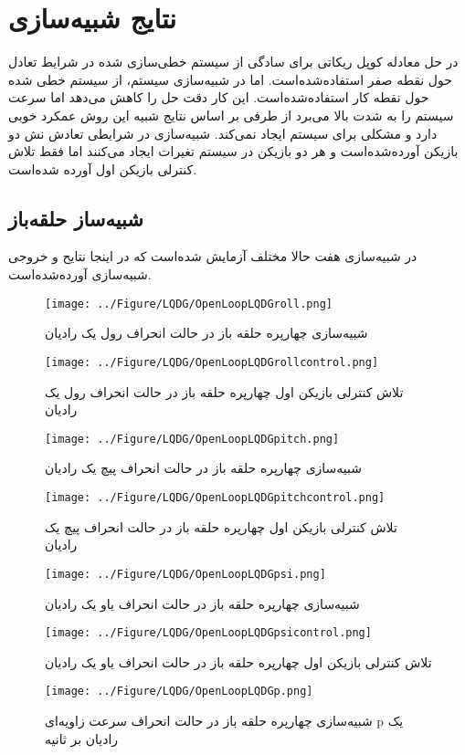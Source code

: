\chapter{نتایج شبیه‌سازی}
در حل معادله کوپل ریکاتی برای سادگی از سیستم خطی‌سازی شده در شرایط تعادل حول نقطه صفر استفاده‌شده‌است. اما در شبیه‌سازی سیستم، از سیستم خطی شده حول نقطه کار استفاده‌شده‌است. این کار دقت حل را کاهش می‌دهد اما سرعت سیستم را به شدت بالا می‌برد از طرفی بر اساس نتایج شبیه این روش عمکرد خوبی دارد و مشکلی برای سیستم ایجاد نمی‌کند. شبیه‌سازی در شرایطی تعادش نش دو بازیکن آورده‌شده‌است و هر دو بازیکن در سیستم تغیرات ایجاد می‌کنند اما فقط تلاش کنترلی بازیکن اول آورده شده‌است.
\section{شبیه‌ساز حلقه‌باز}
در شبیه‌سازی هفت حالا مختلف آزمایش شده‌است که در اینجا نتایح و خروجی شبیه‌‌سازی آورده‌شده‌است.
\begin{figure}[H]
	\texttt{[image: ../Figure/LQDG/OpenLoopLQDGroll.png]}
	\centering
	\caption{شبیه‌‌سازی چهارپره حلقه باز در حالت انحراف رول یک رادیان}
\end{figure}
\begin{figure}[H]
	\texttt{[image: ../Figure/LQDG/OpenLoopLQDGrollcontrol.png]}
	\centering
	\caption{تلاش کنترلی بازیکن اول چهارپره حلقه باز در حالت انحراف رول یک رادیان}
\end{figure}
	\begin{figure}[H]
		\texttt{[image: ../Figure/LQDG/OpenLoopLQDGpitch.png]}
		\centering
		\caption{شبیه‌‌سازی چهارپره حلقه باز در حالت انحراف پیچ یک رادیان}
	\end{figure}
	\begin{figure}[H]
		\texttt{[image: ../Figure/LQDG/OpenLoopLQDGpitchcontrol.png]}
		\centering
		\caption{تلاش کنترلی بازیکن اول چهارپره حلقه باز در حالت انحراف پیچ یک رادیان}
\end{figure}
	\begin{figure}[H]
	\texttt{[image: ../Figure/LQDG/OpenLoopLQDGpsi.png]}
	\centering
	\caption{شبیه‌‌سازی چهارپره حلقه باز در حالت انحراف یاو یک رادیان}
\end{figure}
\begin{figure}[H]
	\texttt{[image: ../Figure/LQDG/OpenLoopLQDGpsicontrol.png]}
	\centering
	\caption{تلاش کنترلی بازیکن اول چهارپره حلقه باز در حالت انحراف یاو یک رادیان}
\end{figure}
	\begin{figure}[H]
	\texttt{[image: ../Figure/LQDG/OpenLoopLQDGp.png]}
	\centering
	\caption{شبیه‌‌سازی چهارپره حلقه باز در حالت انحراف سرعت زاویه‌ای p 
		 یک رادیان بر ثانیه}
\end{figure}
